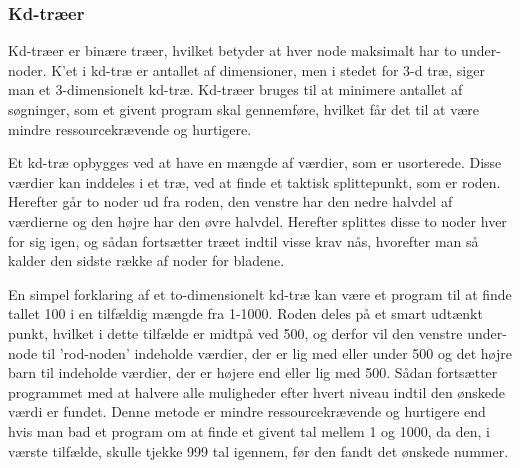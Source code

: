 \subsubsection{Kd-træer}
\label{sec:kdtree}

Kd-træer er binære træer, hvilket betyder at hver node maksimalt har to under-noder. K'et i kd-træ er antallet af dimensioner, men i stedet for 3-d træ, siger man et 3-dimensionelt kd-træ. Kd-træer bruges til at minimere antallet af søgninger, som et givent program skal gennemføre, hvilket får det til at være mindre ressourcekrævende og hurtigere. 

Et kd-træ opbygges ved at have en mængde af værdier, som er usorterede. Disse værdier kan inddeles i et træ, ved at finde et taktisk splittepunkt, som er roden. Herefter går to noder ud fra roden, den venstre har den nedre halvdel af værdierne og den højre har den øvre halvdel. Herefter splittes disse to noder hver for sig igen, og sådan fortsætter træet indtil visse krav nås, hvorefter man så kalder den sidste række af noder for bladene. 

En simpel forklaring af et to-dimensionelt kd-træ kan være et program til at finde tallet 100 i en tilfældig mængde fra 1-1000. Roden deles på et smart udtænkt punkt, hvilket i dette tilfælde er midtpå ved 500, og derfor vil den venstre under-node til 'rod-noden' indeholde værdier, der er lig med eller under 500 og det højre barn til indeholde værdier, der er højere end eller lig med 500. Sådan fortsætter programmet med at halvere alle muligheder efter hvert niveau indtil den ønskede værdi er fundet. Denne metode er mindre ressourcekrævende og hurtigere end hvis man bad et program om at finde et givent tal mellem 1 og 1000, da den, i værste tilfælde, skulle tjekke 999 tal igennem, før den fandt det ønskede nummer.